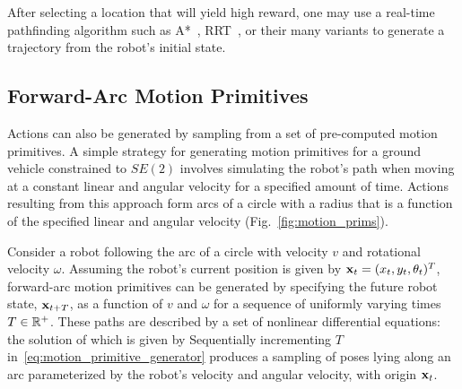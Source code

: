 After selecting a location that will yield high reward,
one may use a real-time pathfinding algorithm such as A*~\cite{hart1968formal},
RRT~\cite{lavalle1998rapidly}, or their many variants to generate a trajectory from
the robot's initial state.

\subsection{Forward-Arc Motion Primitives}
\label{subsec:fa_motion_primitives}

Actions can also be generated by sampling from a set of
pre-computed motion primitives. A simple strategy for generating motion
primitives for a ground vehicle constrained to $SE(2)$ involves
simulating the robot's path when moving at a constant linear and angular
velocity for a specified amount of time.
Actions resulting from this approach form arcs of a circle with a radius that is a
function of the specified linear and angular velocity (Fig.~\ref{fig:motion_prims}).

Consider a robot following the arc of a
circle with velocity $v$ and rotational velocity $\omega$. Assuming the robot's
current position is given by $\mathbf{x}_t=(x_t,y_t,\theta_t)^T$, forward-arc motion primitives
can be generated by specifying the future robot state, $\mathbf{x}_{t+T}$,
as a function of $v$ and $\omega$ for a sequence of uniformly varying
times $T \in {\mathbb{R}}^{+}$. These paths are described
by a set of nonlinear differential equations:
%
%
the solution of which is given by
%
%
Sequentially incrementing $T$ in~\eqref{eq:motion_primitive_generator}
produces a sampling of poses lying along an arc
parameterized by the robot's velocity and angular velocity, with origin $\mathbf{x}_{t}$.


